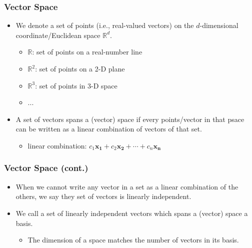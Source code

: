 \documentclass[pdflatex, 12pt]{beamer}
\newcommand{\R}{\mathbb{R}}
\begin{document}
\begin{frame}
\frametitle{Vector Space}
\begin{itemize}
\item We denote a set of points (i.e., real-valued vectors) on the $d$-dimensional coordinate/Euclidean space $\R^d$.
 \begin{itemize}
 \item $\R$: set of points on a real-number line
 \item $\R^2$: set of points on a 2-D plane
 \item $\R^3$: set of points in 3-D space
 \item ...
 \end{itemize}
\vspace{0.4cm}
\item A set of vectors {\color{red} spans} a (vector) space if every points/vector in that psace can be written as a linear combination of vectors of that set.
 \begin{itemize}
 \item {\color{red} linear combination}: $c_1 \bm{x_1} + c_2 \bm{x_2} + \cdots + c_n \bm{x_n}$
 \end{itemize}
\end{itemize}
\end{frame}

\begin{frame}
\frametitle{Vector Space (cont.)}
\begin{itemize}
\item When we cannot write any vector in a set as a linear combination of the others, we say they set of vectors is {\color{red} linearly independent}.
\vspace{0.4cm}
\item We call a set of linearly independent vectors which spans a (vector) space a {\color{red} basis}.
 \begin{itemize}
 \item The dimension of a space matches the number of vectors in its basis. 
 \end{itemize}
\end{itemize}
\end{frame}
\end{document}
